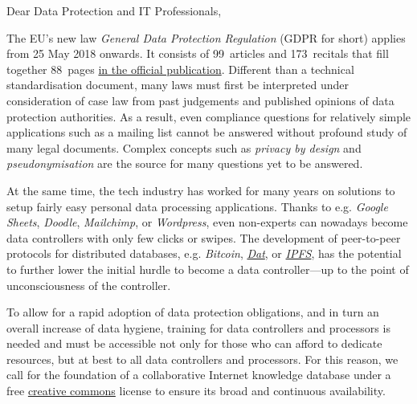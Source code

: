 \documentclass{scrlttr2}
\begin{document}



\begin{letter}{}
\opening{Dear Data Protection and IT Professionals,}


The EU's new law \emph{General Data Protection Regulation} (GDPR for
short) applies from 25 May 2018 onwards. It consists of 99~articles and
173~recitals that fill together 88~pages
\href{http://eur-lex.europa.eu/legal-content/EN/TXT/?uri=uriserv:OJ.L_.2016.119.01.0001.01.ENG}{in
the official publication}. Different than a technical standardisation
document, many laws must first be interpreted under consideration of
case law from past judgements and published opinions of data protection
authorities. As a result, even compliance questions for relatively
simple applications such as a mailing list cannot be answered without
profound study of many legal documents. Complex concepts such as
\emph{privacy by design} and \emph{pseudonymisation} are the source for
many questions yet to be answered.

At the same time, the tech industry has worked for many years on
solutions to setup fairly easy personal data processing applications.
Thanks to e.g. \emph{Google Sheets}, \emph{Doodle}, \emph{Mailchimp}, or
\emph{Wordpress}, even non-experts can nowadays become data controllers
with only few clicks or swipes. The development of peer-to-peer
protocols for distributed databases, e.g. \emph{Bitcoin},
\emph{\href{https://datproject.org/}{Dat}}, or
\emph{\href{https://ipfs.io/}{IPFS}}, has the potential to further lower
the initial hurdle to become a data controller---up to the point of
unconsciousness of the controller.

To allow for a rapid adoption of data protection obligations, and in
turn an overall increase of data hygiene, training for data controllers
and processors is needed and must be accessible not only for those who
can afford to dedicate resources, but at best to all data controllers
and processors. For this reason, we call for the foundation of a
collaborative Internet knowledge database under a free
\href{https://creativecommons.org/}{creative commons} license to ensure
its broad and continuous availability.


\end{letter}
\end{document}
